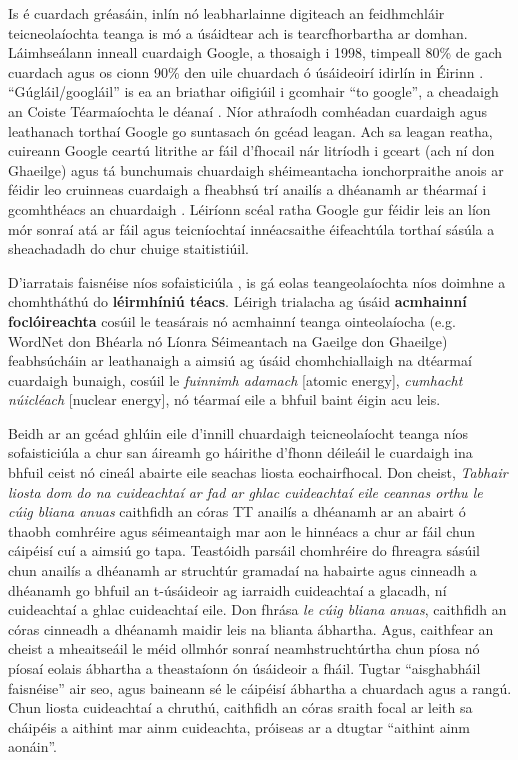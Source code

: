 \begin{multicols}{2}
Is é cuardach gréasáin, inlín nó leabharlainne digiteach an feidhmchláir teicneolaíochta teanga is mó a úsáidtear ach is tearcfhorbartha ar domhan. Láimhseálann inneall cuardaigh Google, a thosaigh i 1998, timpeall 80\% de gach cuardach agus os cionn 90\% den uile chuardach ó úsáideoirí idirlín in Éirinn \cite{googlemarketshare}.  ``Gúgláil/googláil'' is ea an briathar oifigiúil i gcomhair ``to google'', a cheadaigh an Coiste Téarmaíochta le déanaí \cite{kilgarriff2010}.  Níor athraíodh comhéadan cuardaigh agus leathanach torthaí Google go suntasach ón gcéad leagan. Ach sa leagan reatha, cuireann Google ceartú litrithe ar fáil d’fhocail nár litríodh i gceart (ach ní don Ghaeilge) agus tá bunchumais chuardaigh shéimeantacha ionchorpraithe anois ar féidir leo cruinneas cuardaigh a fheabhsú trí anailís a dhéanamh ar théarmaí i gcomhthéacs an chuardaigh \cite{googlesemsearch}. Léiríonn scéal ratha Google gur féidir leis an líon mór sonraí atá ar fáil agus teicníochtaí innéacsaithe éifeachtúla torthaí sásúla a sheachadadh do chur chuige staitistiúil. 

D’iarratais faisnéise níos sofaisticiúla , is gá eolas teangeolaíochta níos doimhne a chomhtháthú do \textbf{léirmhíniú téacs}. Léirigh trialacha ag úsáid \textbf{acmhainní foclóireachta} cosúil le teasárais nó acmhainní teanga ointeolaíocha (e.g. WordNet don Bhéarla nó Líonra Séimeantach na Gaeilge don Ghaeilge) feabhsúcháin ar leathanaigh a aimsiú ag úsáid chomhchiallaigh na dtéarmaí cuardaigh bunaigh, cosúil le \textit{fuinnimh adamach} [atomic energy], \textit{cumhacht núicléach} [nuclear energy], nó téarmaí eile a bhfuil baint éigin acu leis.

Beidh ar an gcéad ghlúin eile d’innill chuardaigh teicneolaíocht teanga níos sofaisticiúla a chur san áireamh go háirithe d’fhonn déileáil le cuardaigh ina bhfuil ceist nó cineál abairte eile seachas liosta eochairfhocal. Don cheist, \textit{Tabhair liosta dom do na cuideachtaí ar fad ar ghlac cuideachtaí eile ceannas orthu le cúig bliana anuas} caithfidh an córas TT anailís a dhéanamh ar an abairt ó thaobh comhréire agus séimeantaigh mar aon le hinnéacs a chur ar fáil chun cáipéisí cuí a aimsiú go tapa. Teastóidh parsáil chomhréire do fhreagra sásúil chun anailís a dhéanamh ar struchtúr gramadaí na habairte agus cinneadh a dhéanamh go bhfuil an t-úsáideoir ag iarraidh cuideachtaí a glacadh, ní cuideachtaí a ghlac cuideachtaí eile. Don fhrása \textit{le cúig bliana anuas}, caithfidh an córas cinneadh a dhéanamh maidir leis na blianta ábhartha. Agus, caithfear an cheist a mheaitseáil le méid ollmhór sonraí neamhstruchtúrtha chun píosa nó píosaí eolais ábhartha a theastaíonn ón úsáideoir a fháil. Tugtar ``aisghabháil faisnéise'' air seo, agus baineann sé le cáipéisí ábhartha a chuardach agus a rangú. Chun liosta cuideachtaí a chruthú, caithfidh an córas sraith focal ar leith sa cháipéis a aithint mar ainm cuideachta, próiseas ar a dtugtar ``aithint ainm aonáin''.


\end{multicols}
